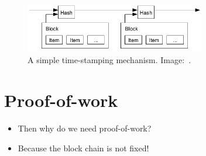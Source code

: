 \begin{frame}
  \begin{figure}
    \includegraphics[width=0.7\textwidth]{fig/bitcoin-stamp.png}
    \caption{A simple time-stamping mechanism.
    Image:~\cite{Nakamoto2008bap}.}
  \end{figure}

  \vfill

\end{frame}


\section{Proof-of-work}

\begin{frame}
  \begin{question}
    \begin{itemize}
      \item Then why do we need proof-of-work?
    \end{itemize}
  \end{question}

  \begin{remark}
    \begin{itemize}
      \item Because the block chain is not fixed!
    \end{itemize}
  \end{remark}
\end{frame}

